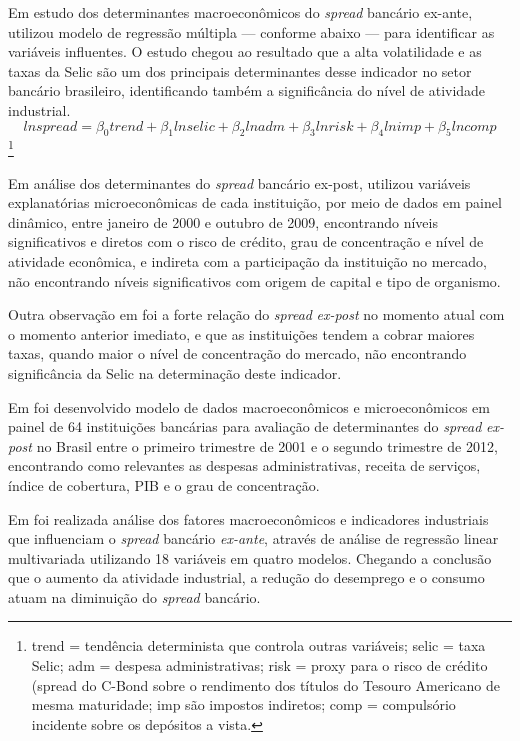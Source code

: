 \documentclass[12pt,12pt,openright,oneside,a4paper,chapter=TITLE,section=TITLE,subsection=TITLE,subsubsection=TITLE,english,french,spanish,portugues,sumario=tradicional]{abntex2}
\begin{document}
Em estudo dos determinantes macroeconômicos do \emph{spread} bancário ex-ante, \textcite{oreiro-2006} utilizou modelo de regressão múltipla --- conforme abaixo --- para identificar as variáveis influentes. O estudo chegou ao resultado que a alta volatilidade e as taxas da Selic são um dos principais determinantes desse indicador no setor bancário brasileiro, identificando também a significância do nível de atividade industrial.
\[
ln spread = \beta_0 trend + \beta_1 ln selic + \beta_2 ln adm + \beta_3 ln risk + \beta_4 ln imp + \beta_5 ln comp
\]
\footnote{trend = tendência determinista que controla outras variáveis; selic = taxa Selic; adm = despesa administrativas; risk =  proxy para o risco de crédito (spread do C-Bond sobre o rendimento dos títulos do Tesouro Americano de mesma maturidade; imp são impostos indiretos; comp = compulsório incidente sobre os depósitos a vista.}

Em análise dos determinantes do \emph{spread} bancário ex-post, \textcite{dantas:2012} utilizou variáveis explanatórias microeconômicas de cada instituição, por meio de dados em painel dinâmico, entre janeiro de 2000 e outubro de 2009, encontrando níveis significativos e diretos com o risco de crédito, grau de concentração e nível de atividade econômica, e indireta com a participação da instituição no mercado, não encontrando níveis significativos com origem de capital e tipo de organismo.

Outra observação em \textcite{dantas:2012} foi a forte relação do \emph{spread}
\emph{ex-post} no momento atual com o momento anterior imediato, e que as
instituições tendem a cobrar maiores taxas, quando maior o nível de
concentração do mercado, não encontrando significância da Selic na determinação
deste indicador.

Em \textcite{almeida:2013} foi desenvolvido modelo de dados macroeconômicos e microeconômicos em painel de 64 instituições bancárias para avaliação de determinantes do \emph{spread} \emph{ex-post} no Brasil entre o primeiro trimestre de 2001 e o segundo trimestre de 2012, encontrando como relevantes as despesas administrativas, receita de serviços, índice de cobertura, PIB e o grau de concentração.

Em \textcite{durigan:2018} foi realizada análise dos fatores macroeconômicos e
indicadores industriais que influenciam o \emph{spread} bancário \emph{ex-ante}, através de análise de regressão linear multivariada utilizando 18 variáveis em quatro
modelos. Chegando a conclusão que o aumento da atividade industrial, a redução
do desemprego e o consumo atuam na diminuição do \emph{spread} bancário.
\end{document}

